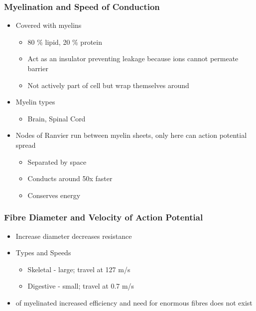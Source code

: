 \documentclass[11pt]{article}
\begin{document}
\subsubsection{Myelination and Speed of Conduction}
\begin{itemize}
\item Covered with myelins 
\begin{itemize}
\item 80 \% lipid, 20 \% protein
\item Act as an insulator preventing leakage because ions cannot permeate barrier
\item Not actively part of cell but wrap themselves around
\end{itemize}
\item Myelin types
\begin{itemize}
\item Brain, Spinal Cord
\end{itemize}
\item Nodes of Ranvier run between myelin sheets, only here can action potential spread
\begin{itemize}
\item Separated by space
\item Conducts around 50x faster
\item Conserves energy
\end{itemize}
\end{itemize}
\subsubsection{Fibre Diameter and Velocity of Action Potential}
\begin{itemize}
\item Increase diameter decreases resistance 
\item Types and Speeds
\begin{itemize}
\item Skeletal - large; travel at 127 m/s
\item Digestive - small; travel at 0.7 m/s
\end{itemize}
\item of myelinated increased efficiency and need for enormous fibres does not exist
\end{itemize}
\end{document}
